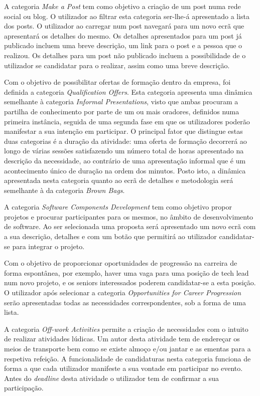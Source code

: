A categoria \textit{Make a Post} tem como objetivo a criação de um post numa rede social ou blog. 
O utilizador ao filtrar esta categoria ser-lhe-á apresentado a lista dos posts. 
O utilizador ao carregar num post navegará para um novo ecrã que apresentará os detalhes do mesmo. 
Os detalhes apresentados para um post já publicado incluem uma breve descrição, um link para o post e a pessoa que o realizou. 
Os detalhes para um post não publicado incluem a possibilidade de o utilizador se candidatar para o realizar, assim como uma breve descrição.

Com o objetivo de possibilitar ofertas de formação dentro da empresa, foi definida a categoria \textit{Qualification Offers}. 
Esta categoria apresenta uma dinâmica semelhante à categoria \textit{Informal Presentations}, visto que ambas procuram a partilha de 
conhecimento por parte de um ou mais oradores, definidos numa primeira instância, seguida de uma segunda fase em que os utilizadores 
poderão manifestar a sua intenção em participar. 
O principal fator que distingue estas duas categorias é a duração da atividade: 
uma oferta de formação decorrerá ao longo de várias sessões satisfazendo um número total de horas apresentado na descrição da necessidade, 
ao contrário de uma apresentação informal que é um acontecimento único de duração na ordem dos minutos. 
Posto isto, a dinâmica apresentada nesta categoria quanto ao ecrã de detalhes e metodologia será semelhante à da categoria \textit{Brown Bags}.

A categoria \textit{Software Components Development} tem como objetivo propor projetos e procurar participantes para os mesmos, no âmbito de desenvolvimento de software. 
Ao ser selecionada uma proposta será apresentado um novo ecrã com a sua descrição, detalhes e com um botão que permitirá ao utilizador 
candidatar-se para integrar o projeto.

Com o objetivo de proporcionar oportunidades de progressão na carreira de forma espontânea, por exemplo, 
haver uma vaga para uma posição de tech lead num novo projeto, e os seniors interessados poderem candidatar-se a esta posição. 
O utilizador após selecionar a categoria \textit{Opportunities for Career Progression} serão apresentadas todas as necessidades correspondentes, sob a forma de uma lista.

A categoria \textit{Off-work Activities} permite a criação de necessidades com o intuito de realizar atividades lúdicas.
Um autor desta atividade tem de endereçar os meios de transporte bem como se existe almoço e/ou jantar e as ementas para a respetiva refeição. 
A funcionalidade de candidaturas nesta categoria funciona de forma a que cada utilizador manifeste a sua vontade em participar no evento.
Antes do \textit{deadline} desta atividade o utilizador tem de confirmar a sua participação.

